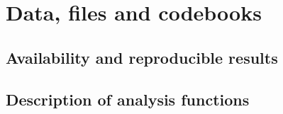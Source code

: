 \chapter{Data, files and codebooks}
\label{app:code}

\section{Availability and reproducible results}

\section{Description of analysis functions}

\blindtext[10]

